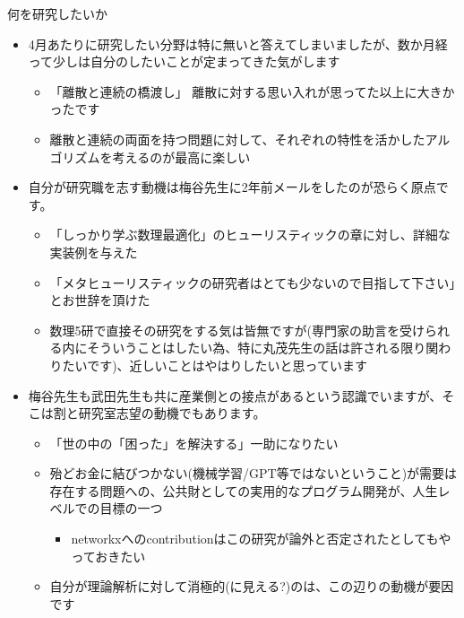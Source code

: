 \documentclass[13pt,aspectratio=169,table,dvipdfmx]{beamer}
\begin{document}
    \begin{frame}{\LARGE{何を研究したいか}}
        \begin{itemize}
            \item 4月あたりに研究したい分野は特に無いと答えてしまいましたが、数か月経って少しは自分のしたいことが定まってきた気がします
                  \begin{itemize}
                      \item 「離散と連続の橋渡し」 離散に対する思い入れが思ってた以上に大きかったです
                      \item 離散と連続の両面を持つ問題に対して、それぞれの特性を活かしたアルゴリズムを考えるのが最高に楽しい
                  \end{itemize}
            \item 自分が研究職を志す動機は梅谷先生に2年前メールをしたのが恐らく原点です。
                  \begin{itemize}
                      \item 「しっかり学ぶ数理最適化」のヒューリスティックの章に対し、詳細な実装例を与えた
                      \item 「メタヒューリスティックの研究者はとても少ないので目指して下さい」とお世辞を頂けた
                      \item 数理5研で直接その研究をする気は皆無ですが(専門家の助言を受けられる内にそういうことはしたい為、特に丸茂先生の話は許される限り関わりたいです)、近しいことはやはりしたいと思っています
                  \end{itemize}
            \item 梅谷先生も武田先生も共に産業側との接点があるという認識でいますが、そこは割と研究室志望の動機でもあります。
                  \begin{itemize}
                      \item 「世の中の「困った」を解決する」一助になりたい
                      \item 殆どお金に結びつかない(機械学習/GPT等ではないということ)が需要は存在する問題への、公共財としての実用的なプログラム開発が、人生レベルでの目標の一つ
                            \begin{itemize}
                                \item networkxへのcontributionはこの研究が論外と否定されたとしてもやっておきたい
                            \end{itemize}
                      \item 自分が理論解析に対して消極的(に見える?)のは、この辺りの動機が要因です
                  \end{itemize}
        \end{itemize}
    \end{frame}
\end{document}
